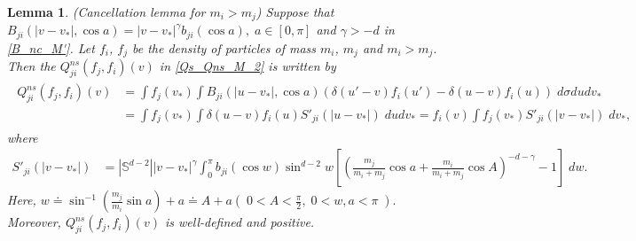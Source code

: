 \documentclass[reqno,10pt]{amsart}
\newtheorem{lemma}[theorem]{Lemma}
\numberwithin{equation}{section}
\begin{document}
\begin{lemma} (Cancellation lemma for $m_i > m_j$) \label{CC_M_2}
Suppose that $B_{ji}(|v-v_*|,\cos a)=|v-v_*|^{\gamma}b_{ji}(\cos a), \;a \in [0,\pi]$
and $\gamma>-d$ in \eqref{B_nc_M'}. Let $f_i$, $f_j$ be the density of particles of mass $m_i$, $m_j$ and $m_i>m_j.$ Then the $Q_{ji}^{ns}(f_j,f_i)(v)$ in \eqref{Qs_Qns_M_2} is written by 
\begin{align} \label{Qns_CC_M_2} 
\begin{split}
    Q^{ns}_{ji}(f_j, f_i)(v) &= \int f_j(v_*)\int B_{ji}(|u-v_*|, \cos a)(\delta(u'-v)f_i(u')-\delta(u-v)f_i(u)) \; d\sigma du dv_*  \\&=\int f_j(v_*) \int \delta(u-v)f_i(u)S'_{ji}(|u-v_*|) \; du
    dv_*
    =f_i(v) \int f_j(v_*)S'_{ji}(|v-v_*|) \;
    dv_*,
\end{split}
\end{align}
where  
\begin{align*}
    S'_{ji}(|v-v_*|)
    &= |\mathbb{S}^{d-2}||v-v_*|^{\gamma}\int_0^\pi b_{ji}(\cos w)\sin^{d-2}w [(\frac{m_j}{m_i+m_j}\cos a + \frac{m_i}{m_i+m_j}\cos A)^{-d-\gamma}-1] \; dw.
\end{align*}
Here, $w \doteq \sin^{-1}(\frac{m_j}{m_i}\sin a)+a \doteq A+a(\; 0<A<\frac{\pi}{2}, \; 0<w,a<\pi \;).$
Moreover, $Q_{ji}^{ns}(f_j,f_i)(v)$ is well-defined and positive.
\end{lemma}
\end{document}
